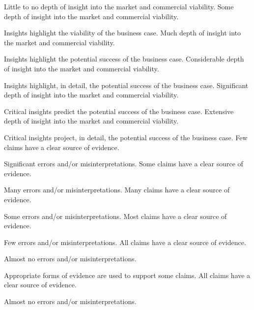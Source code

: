 \documentclass{../fal_assignment}
\begin{document}
\begin{markingrubric}
%
        \grade  \fail	Little to no depth of insight into the market and commercial viability.
        \grade 		Some depth of insight into the market and commercial viability.
        \par 		Insights highlight the viability of the business case.
        \grade 		Much depth of insight into the market and commercial viability.
        \par 		Insights highlight the potential success of the business case.
        \grade 		Considerable depth of insight into the market and commercial viability.
        \par 		Insights highlight, in detail, the potential success of the business case.
        \grade 		Significant depth of insight into the market and commercial viability.
        \par 		Critical insights predict the potential success of the business case.
        \grade 		Extensive depth of insight into the market and commercial viability.
        \par 		Critical insights project, in detail, the potential success of the business case.
%
        \grade  \fail	Few claims have a clear source of evidence.
        \par 		Significant errors and/or misinterpretations.
        \grade 		Some claims have a clear source of evidence.
        \par 		Many errors and/or misinterpretations.
        \grade 		Many claims have a clear source of evidence.
        \par 		Some errors and/or misinterpretations.
        \grade 		Most claims have a clear source of evidence.
        \par 		Few errors and/or misinterpretations.
        \grade 		All claims have a clear source of evidence.
        \par 		Almost no errors and/or misinterpretations.
        \par 		Appropriate forms of evidence are used to support some claims.
        \grade 		All claims have a clear source of evidence.
        \par 		Almost no errors and/or misinterpretations.

\end{markingrubric}
\end{document}
